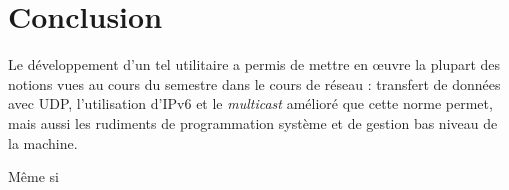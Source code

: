 \documentclass[11pt,a4paper]{article}
\begin{document}
	
\section{Conclusion}
	
	Le développement d'un tel utilitaire a permis de mettre en œuvre la plupart des notions vues au cours du semestre dans le cours
	de réseau : transfert de données avec UDP, l'utilisation d'IPv6 et le \emph{multicast} amélioré que cette norme permet, mais aussi les rudiments
	 de programmation système et de gestion bas niveau de la machine.
	
	Même si
	
\end{document}
